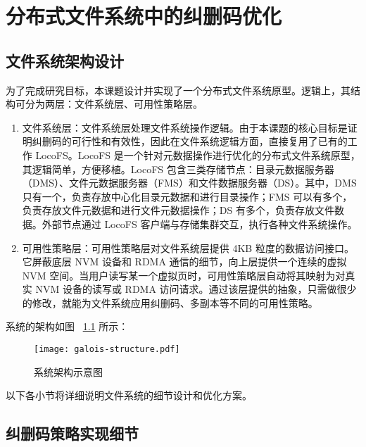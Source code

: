 
\chapter{分布式文件系统中的纠删码优化}
\label{cha:design}


\section{文件系统架构设计}
\label{sec:ch3_struct}

为了完成研究目标，本课题设计并实现了一个分布式文件系统原型。逻辑上，其结构可分为两层：文件系统层、可用性策略层。

\begin{enumerate}[(1)]
    
    \item {\heiti 文件系统层}：文件系统层处理文件系统操作逻辑。由于本课题的核心目标是证明纠删码的可行性和有效性，因此在文件系统逻辑方面，直接复用了已有的工作 LocoFS\cite{locofs2017}。LocoFS 是一个针对元数据操作进行优化的分布式文件系统原型，其逻辑简单，方便移植。LocoFS 包含三类存储节点：目录元数据服务器（DMS）、文件元数据服务器（FMS）和文件数据服务器（DS）。其中，DMS 只有一个，负责存放中心化目录元数据和进行目录操作；FMS 可以有多个，负责存放文件元数据和进行文件元数据操作；DS 有多个，负责存放文件数据。外部节点通过 LocoFS 客户端与存储集群交互，执行各种文件系统操作。
    
    \item {\heiti 可用性策略层}：可用性策略层对文件系统层提供 4KB 粒度的数据访问接口。它屏蔽底层 NVM 设备和 RDMA 通信的细节，向上层提供一个连续的虚拟 NVM 空间。当用户读写某一个虚拟页时，可用性策略层自动将其映射为对真实 NVM 设备的读写或 RDMA 访问请求。通过该层提供的抽象，只需做很少的修改，就能为文件系统应用纠删码、多副本等不同的可用性策略。

\end{enumerate}

系统的架构如图 ~\ref{fig:struct} 所示：

\begin{figure}[H]
    \centering
    \texttt{[image: galois-structure.pdf]}
    \caption{系统架构示意图}
    \label{fig:struct}
\end{figure}

以下各小节将详细说明文件系统的细节设计和优化方案。

\section{纠删码策略实现细节}
\label{sec:ch3_ec}

